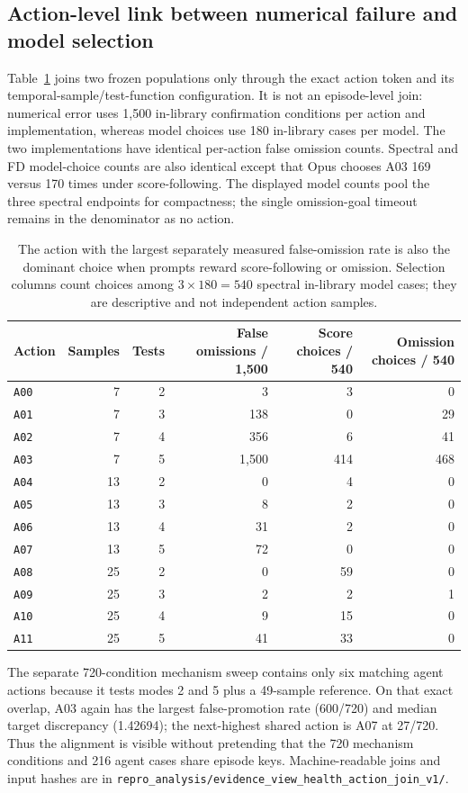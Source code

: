 \documentclass{article}
\begin{document}
\subsection{Action-level link between numerical failure and model selection}
\label{sec:action-level-join}
Table~\ref{tab:action-level-join} joins two frozen populations only through the exact action token
and its temporal-sample/test-function configuration. It is not an episode-level join: numerical
error uses 1,500 in-library confirmation conditions per action and implementation, whereas model
choices use 180 in-library cases per model. The two implementations have identical per-action false
omission counts. Spectral and FD model-choice counts are also identical except that Opus chooses A03
169 versus 170 times under score-following. The displayed model counts pool the three spectral
endpoints for compactness; the single omission-goal timeout remains in the denominator as no action.
\begin{table}[ht]
\centering\scriptsize
\caption{The action with the largest separately measured false-omission rate is also the dominant
choice when prompts reward score-following or omission. Selection columns count choices among
$3\times180=540$ spectral in-library model cases; they are descriptive and not independent action
samples.}
\label{tab:action-level-join}
\begin{tabular}{lrrr rr}
\toprule
Action & Samples & Tests & False omissions / 1,500 & Score choices / 540 & Omission choices / 540 \\
\midrule
\texttt{A00} & 7  & 2 & 3    & 3   & 0 \\
\texttt{A01} & 7  & 3 & 138  & 0   & 29 \\
\texttt{A02} & 7  & 4 & 356  & 6   & 41 \\
\texttt{A03} & 7  & 5 & 1,500& 414 & 468 \\
\texttt{A04} & 13 & 2 & 0    & 4   & 0 \\
\texttt{A05} & 13 & 3 & 8    & 2   & 0 \\
\texttt{A06} & 13 & 4 & 31   & 2   & 0 \\
\texttt{A07} & 13 & 5 & 72   & 0   & 0 \\
\texttt{A08} & 25 & 2 & 0    & 59  & 0 \\
\texttt{A09} & 25 & 3 & 2    & 2   & 1 \\
\texttt{A10} & 25 & 4 & 9    & 15  & 0 \\
\texttt{A11} & 25 & 5 & 41   & 33  & 0 \\
\bottomrule
\end{tabular}
\end{table}
The separate 720-condition mechanism sweep contains only six matching agent actions because it
tests modes 2 and 5 plus a 49-sample reference. On that exact overlap, A03 again has the largest
false-promotion rate (600/720) and median target discrepancy (1.42694); the next-highest shared
action is A07 at 27/720. Thus the alignment is visible without pretending that the 720 mechanism
conditions and 216 agent cases share episode keys. Machine-readable joins and input hashes are in
\nolinkurl{repro_analysis/evidence_view_health_action_join_v1/}.
\end{document}
